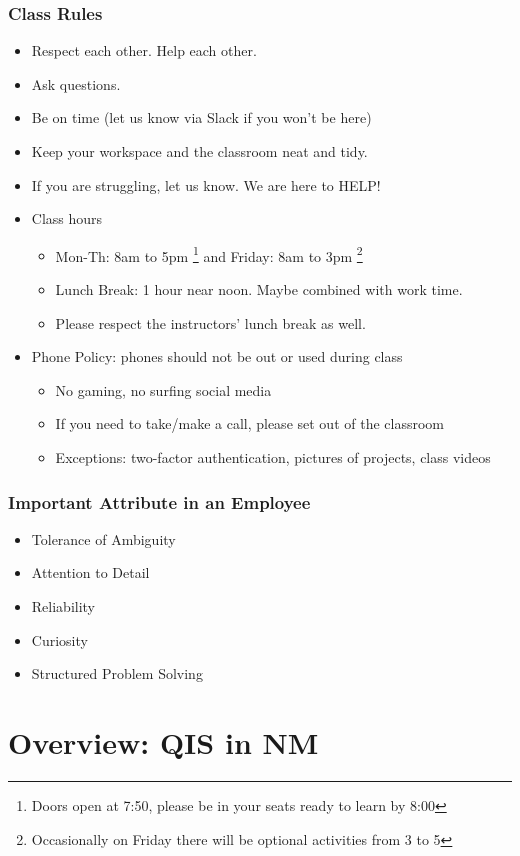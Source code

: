 \documentclass{beamer}
\begin{document}
\begin{frame}\frametitle{Class Rules}
\begin{itemize}
\item Respect each other. Help each other.
\item Ask questions. 
\item Be on time (let us know via Slack if you won't be here) 
\item Keep your workspace and the classroom neat and tidy.
\item If you are struggling, let us know. We are here to HELP!
\item Class hours
\begin{itemize}
\item Mon-Th: 8am to 5pm \footnote{Doors open at 7:50, please be in your seats ready to learn by 8:00} and Friday: 8am to 3pm \footnote{Occasionally on Friday there will be optional activities from 3 to 5}
\item Lunch Break: 1 hour near noon. Maybe combined with work time. 
\item Please respect the instructors' lunch break as well.
\end{itemize}
\item Phone Policy: phones should not be out or used during class
\begin{itemize}
\item No gaming, no surfing social media
\item If you need to take/make a call, please set out of the classroom
\item Exceptions: two-factor authentication, pictures of projects, class videos
\end{itemize}
\end{itemize}
\end{frame}

\begin{frame}\frametitle{Important Attribute in an Employee}
\begin{itemize}
\item Tolerance of Ambiguity
\item Attention to Detail
\item Reliability 
\item Curiosity
\item Structured Problem Solving
\end{itemize}
\end{frame}

\section{Overview: QIS in NM}
\end{document}
